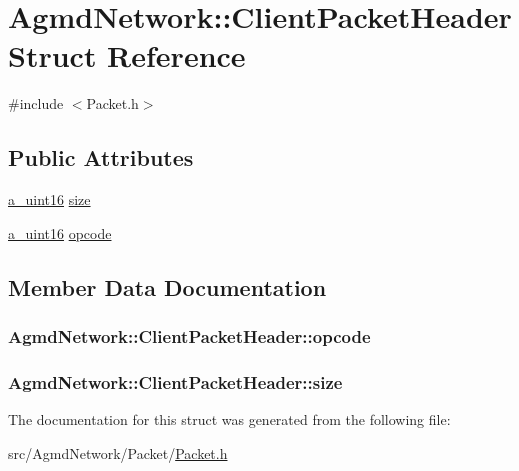 \hypertarget{struct_agmd_network_1_1_client_packet_header}{\section{Agmd\+Network\+:\+:Client\+Packet\+Header Struct Reference}
\label{struct_agmd_network_1_1_client_packet_header}
}


{\ttfamily \#include $<$Packet.\+h$>$}

\subsection*{Public Attributes}
\begin{DoxyCompactItemize}
\item 
\hyperlink{_common_defines_8h_a7e7afab9b2de210021aed9953c6b367f}{a\+\_\+uint16} \hyperlink{struct_agmd_network_1_1_client_packet_header_a6d07ba84fefd584f7ace458c9789f58a}{size}
\item 
\hyperlink{_common_defines_8h_a7e7afab9b2de210021aed9953c6b367f}{a\+\_\+uint16} \hyperlink{struct_agmd_network_1_1_client_packet_header_a9573d4e8df60c5dfcffd3046c04a42a8}{opcode}
\end{DoxyCompactItemize}


\subsection{Member Data Documentation}
\hypertarget{struct_agmd_network_1_1_client_packet_header_a9573d4e8df60c5dfcffd3046c04a42a8}{
\subsubsection[{opcode}]{ Agmd\+Network\+::\+Client\+Packet\+Header\+::opcode}}\label{struct_agmd_network_1_1_client_packet_header_a9573d4e8df60c5dfcffd3046c04a42a8}
\hypertarget{struct_agmd_network_1_1_client_packet_header_a6d07ba84fefd584f7ace458c9789f58a}{
\subsubsection[{size}]{ Agmd\+Network\+::\+Client\+Packet\+Header\+::size}}\label{struct_agmd_network_1_1_client_packet_header_a6d07ba84fefd584f7ace458c9789f58a}


The documentation for this struct was generated from the following file\+:\begin{DoxyCompactItemize}
\item 
src/\+Agmd\+Network/\+Packet/\hyperlink{_packet_8h}{Packet.\+h}\end{DoxyCompactItemize}
